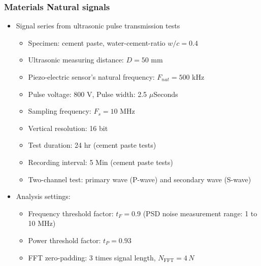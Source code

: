 \documentclass[11pt,aspectratio=169]{beamer}
\begin{document}
	\begin{frame}
		\frametitle{Materials \textendash{} Natural signals}
		\begin{itemize}
			\item \textcolor{RIPtitlecol}{Signal series from ultrasonic pulse transmission tests}
			\begin{itemize}
				\item Specimen: cement paste, water-cement-ratio $w/c = 0.4$
				\item Ultrasonic measuring distance: $D = 50$ mm
				\item Piezo-electric sensor's natural frequency: $F_{nat} = 500$ kHz
				\item Pulse voltage: 800 V, Pulse width: 2.5 $\mu$Seconds
				\item Sampling frequency: $F_s = 10$ MHz
				\item Vertical resolution: 16 bit
				\item Test duration: 24 hr (cement paste tests)
				\item Recording interval: 5 Min (cement paste tests)
				\item Two-channel test: primary wave (P-wave) and secondary wave (S-wave)
			\end{itemize}
			\item \textcolor{RIPtitlecol}{Analysis settings:}
			\begin{itemize}
				\item Frequency threshold factor: $t_F = 0.9$ (PSD noise measurement range: 1 to 10 MHz)
				\item Power threshold factor: $t_P = 0.93$
				\item FFT zero-padding: 3 times signal length, $N_{\text{FFT}} = 4\,N$
			\end{itemize}
		\end{itemize}	
	\end{frame}
\end{document}
